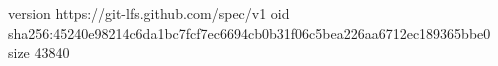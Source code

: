 version https://git-lfs.github.com/spec/v1
oid sha256:45240e98214c6da1bc7fcf7ec6694cb0b31f06c5bea226aa6712ec189365bbe0
size 43840
